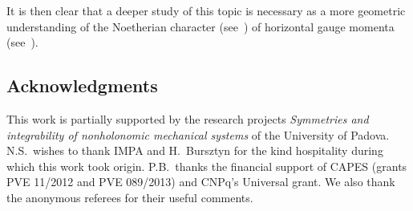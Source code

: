 \documentclass[10pt,a4paper]{amsart}
\numberwithin{equation}{section}
\begin{document}
It is then clear that a deeper study of this topic is necessary as a more
geometric understanding of the Noetherian character (see~\cite{FSG2008, FSG2009})
of horizontal gauge momenta (see~\cite{BS2016}).

\subsection*{Acknowledgments}

This work is partially supported by the research projects
{\it Symmetries and integrability of nonholonomic mechanical systems} of the University of Padova.
N.S.~wishes to thank IMPA and H.~Bursztyn for the kind hospitality during which this work took origin.  P.B.~thanks the f\/inancial support of CAPES (grants PVE 11/2012 and PVE 089/2013) and CNPq's Universal grant. We also thank the anonymous referees for their useful comments.

\end{document}

